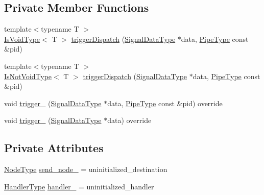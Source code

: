 \subsection*{Private Member Functions}
\begin{DoxyCompactItemize}
\item 
{\footnotesize template$<$typename T $>$ }\\\hyperlink{structvt_1_1pipe_1_1callback_1_1_callback_send_afbb9475a84ba4a7b3db3c7493672dbe6}{Is\+Void\+Type}$<$ T $>$ \hyperlink{structvt_1_1pipe_1_1callback_1_1_callback_send_ab3cf6c2a9a160917917b15f62575b499}{trigger\+Dispatch} (\hyperlink{structvt_1_1pipe_1_1callback_1_1_callback_send_a5b21820f25b28f980921b1fe24d8a2dc}{Signal\+Data\+Type} $\ast$data, \hyperlink{namespacevt_ac9852acda74d1896f48f406cd72c7bd3}{Pipe\+Type} const \&pid)
\item 
{\footnotesize template$<$typename T $>$ }\\\hyperlink{structvt_1_1pipe_1_1callback_1_1_callback_send_adb85e64e67e00aa71a9c173565dfb7dc}{Is\+Not\+Void\+Type}$<$ T $>$ \hyperlink{structvt_1_1pipe_1_1callback_1_1_callback_send_a2e088285dc2c8eb392fc69404e9613b5}{trigger\+Dispatch} (\hyperlink{structvt_1_1pipe_1_1callback_1_1_callback_send_a5b21820f25b28f980921b1fe24d8a2dc}{Signal\+Data\+Type} $\ast$data, \hyperlink{namespacevt_ac9852acda74d1896f48f406cd72c7bd3}{Pipe\+Type} const \&pid)
\item 
void \hyperlink{structvt_1_1pipe_1_1callback_1_1_callback_send_ae86cee78a79a6a0f0823bcbbb94629d5}{trigger\+\_\+} (\hyperlink{structvt_1_1pipe_1_1callback_1_1_callback_send_a5b21820f25b28f980921b1fe24d8a2dc}{Signal\+Data\+Type} $\ast$data, \hyperlink{namespacevt_ac9852acda74d1896f48f406cd72c7bd3}{Pipe\+Type} const \&pid) override
\item 
void \hyperlink{structvt_1_1pipe_1_1callback_1_1_callback_send_a262653b7b9260e5bcd3de0e4cafd9c9c}{trigger\+\_\+} (\hyperlink{structvt_1_1pipe_1_1callback_1_1_callback_send_a5b21820f25b28f980921b1fe24d8a2dc}{Signal\+Data\+Type} $\ast$data) override
\end{DoxyCompactItemize}
\subsection*{Private Attributes}
\begin{DoxyCompactItemize}
\item 
\hyperlink{namespacevt_a866da9d0efc19c0a1ce79e9e492f47e2}{Node\+Type} \hyperlink{structvt_1_1pipe_1_1callback_1_1_callback_send_abaa3c5d86123d749248b13f7d3728aae}{send\+\_\+node\+\_\+} = uninitialized\+\_\+destination
\item 
\hyperlink{namespacevt_af64846b57dfcaf104da3ef6967917573}{Handler\+Type} \hyperlink{structvt_1_1pipe_1_1callback_1_1_callback_send_adc779eec6db67dce8bedd1b4bb13319a}{handler\+\_\+} = uninitialized\+\_\+handler
\end{DoxyCompactItemize}
